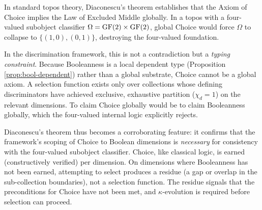 \begin{remark}
\label{rem:diaconescu}
In standard topos theory, Diaconescu's theorem establishes
that the Axiom of Choice implies the Law of Excluded Middle
globally. In a topos with a four-valued subobject classifier
$\Omega = \operatorname{GF}(2) \times \operatorname{GF}(2)$, global Choice would force
$\Omega$ to collapse to $\{(1,0), (0,1)\}$, destroying the
four-valued foundation.

In the discrimination framework, this is not a contradiction
but a \emph{typing constraint}. Because Booleanness is a
local dependent type (Proposition \ref{prop:bool-dependent})
rather than a global substrate, Choice cannot be a global
axiom. A selection function exists only over collections
whose defining discriminators have achieved exclusive,
exhaustive partition ($\chi_d = 1$) on the relevant
dimensions. To claim Choice globally would be to claim
Booleanness globally, which the four-valued internal logic
explicitly rejects.

Diaconescu's theorem thus becomes a corroborating feature:
it confirms that the framework's scoping of Choice to
Boolean dimensions is \emph{necessary} for consistency
with the four-valued subobject classifier. Choice, like
classical logic, is earned (constructively verified) per dimension. On dimensions
where Booleanness has not been earned, attempting to
select produces a residue (a gap or overlap in the
sub-collection boundaries), not a selection function. The
residue signals that the preconditions for Choice have
not been met, and $\kappa$-evolution is required before
selection can proceed.
\end{remark}

